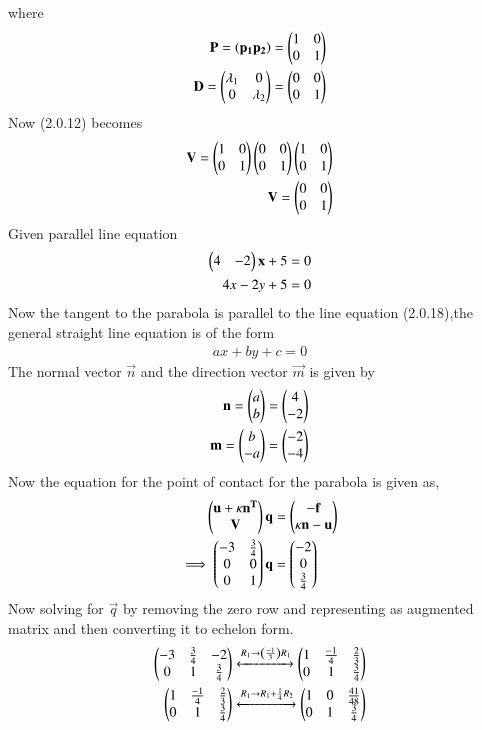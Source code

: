 \documentclass[journal,12pt,twocolumn]{IEEEtran}
\begin{document}
where 
\begin{align}
 \mathbf{P} = \left(\mathbf{p_{1}}\mathbf{p_{2}}\right) = \begin{pmatrix}1&0 \\ 0&1\end{pmatrix}
 \\
 \mathbf{D}=\begin{pmatrix}\lambda_{1}&0 \\ 0&\lambda_{2}\end{pmatrix} = \begin{pmatrix}0&0 \\ 0&1\end{pmatrix}
\end{align}
Now (2.0.12) becomes
\begin{align}
    \mathbf{V}=\begin{pmatrix}1&0 \\ 0&1\end{pmatrix}\begin{pmatrix}0&0 \\ 0&1\end{pmatrix}\begin{pmatrix}1&0 \\ 0&1\end{pmatrix}
    \\
    \mathbf{V}=\begin{pmatrix}0&0 \\ 0&1\end{pmatrix}
\end{align}
Given parallel line equation 
\begin{align}
 \begin{pmatrix}4&-2\end{pmatrix}\mathbf{x} + 5 = 0
 \\
 4x-2y+5=0
\end{align}
Now the tangent to the parabola is parallel to the line equation (2.0.18),the general straight line equation is of the form 
\begin{align}
    ax+by+c=0
\end{align}
The normal vector $\vec{n}$ and the direction vector $\vec{m}$ is given by 
\begin{align}
    \mathbf{n}=\begin{pmatrix}a \\ b\end{pmatrix}=\begin{pmatrix}4 \\ -2\end{pmatrix}
    \\
    \mathbf{m}=\begin{pmatrix}b \\ -a\end{pmatrix}=\begin{pmatrix}-2 \\ -4\end{pmatrix}
\end{align}
Now the equation for the point of contact for the parabola is given as,
\begin{align}
    \begin{pmatrix}\mathbf{u}+\kappa \mathbf{n^T}\\\mathbf{V} \end{pmatrix}\mathbf{q} &= \begin{pmatrix}\mathbf{-f}\\\kappa \mathbf{n} -\mathbf{u}\end{pmatrix}
    \\
   \implies\begin{pmatrix}-3&\frac{3}{4} \\ 0&0 \\ 0&1\end{pmatrix} \mathbf{q}&= \begin{pmatrix}-2 \\ 0 \\ \frac{3}{4}\end{pmatrix}
\end{align}
Now solving for $\vec{q}$ by removing the zero row and representing as augmented matrix and then converting it to echelon form.
\begin{align}
    \begin{pmatrix}-3&\frac{3}{4}&-2 \\ 0&1&\frac{3}{4}\end{pmatrix}\xleftrightarrow{R_1\rightarrow \ensuremath{\left(\frac{-1}{3}\right)}R_1} \begin{pmatrix}1&\frac{-1}{4}&\frac{2}{3} \\ 0&1&\frac{3}{4}\end{pmatrix}
    \\
    \begin{pmatrix}1&\frac{-1}{4}&\frac{2}{3} \\ 0&1&\frac{3}{4}\end{pmatrix}\xleftrightarrow{R_1\rightarrow R_1+\frac{1}{4}R_2}\begin{pmatrix}1&0&\frac{41}{48} \\ 0&1&\frac{3}{4}\end{pmatrix}
\end{align}
\end{document}
